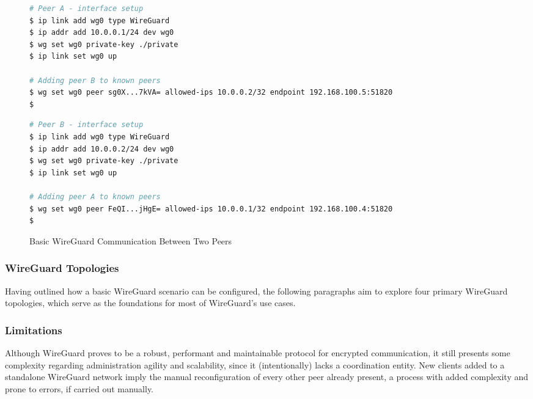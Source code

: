 \documentclass[11pt,twoside,a4paper]{report}
\begin{document}
\begin{figure}
\begin{multicols}{2}
\begin{lstlisting}[language=sh, frame=single, breaklines=true, breakatwhitespace=true, basicstyle=\small]
# Peer A - interface setup
$ ip link add wg0 type WireGuard
$ ip addr add 10.0.0.1/24 dev wg0
$ wg set wg0 private-key ./private
$ ip link set wg0 up

# Adding peer B to known peers
$ wg set wg0 peer sg0X...7kVA= allowed-ips 10.0.0.2/32 endpoint 192.168.100.5:51820
$

\end{lstlisting}
\columnbreak
\begin{lstlisting}[language=sh, frame=single, breaklines=true, breakatwhitespace=true, basicstyle=\small]
# Peer B - interface setup
$ ip link add wg0 type WireGuard
$ ip addr add 10.0.0.2/24 dev wg0
$ wg set wg0 private-key ./private
$ ip link set wg0 up

# Adding peer A to known peers
$ wg set wg0 peer FeQI...jHgE= allowed-ips 10.0.0.1/32 endpoint 192.168.100.4:51820
$

\end{lstlisting}
\end{multicols}
\caption{Basic WireGuard Communication Between Two Peers}
\label{fig:wgconf}
\end{figure}

\subsubsection{WireGuard Topologies}

Having outlined how a basic WireGuard scenario can be configured, the following paragraphs aim to explore four primary WireGuard topologies, which serve as the foundations for most of WireGuard's use cases.


\subsubsection{Limitations}

Although WireGuard proves to be a robust, performant and maintainable protocol for encrypted communication, it still presents some complexity regarding administration agility and scalability, since it (intentionally) lacks a coordination entity. New clients added to a standalone WireGuard network imply the manual reconfiguration of every other peer already present, a process with added complexity and prone to errors, if carried out manually.
\end{document}
